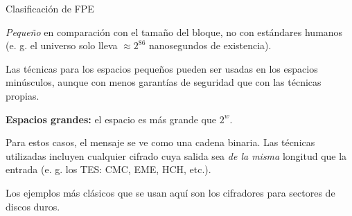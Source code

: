 \begin{frame}{Clasificación de FPE}
  {
    \textit{Pequeño} en comparación con el tamaño del bloque, no con
    estándares humanos (e. g. el universo solo lleva $ \approx 2^{86}$
    nanosegundos de existencia).

    Las técnicas para los espacios pequeños pueden ser usadas en los
    espacios minúsculos, aunque con menos garantías de seguridad que con
    las técnicas propias.
  }

  {
    \textbf{Espacios grandes:} el espacio es más grande que $ 2^w $.

    Para estos casos, el mensaje se ve como una cadena binaria. Las técnicas
    utilizadas incluyen cualquier cifrado cuya salida sea \textit{de la misma}
    longitud que la entrada (e. g. los TES: CMC, EME, HCH, etc.).
  }

  {
    Los ejemplos más clásicos que se usan aquí son los cifradores para sectores
    de discos duros.
  }

\end{frame}
